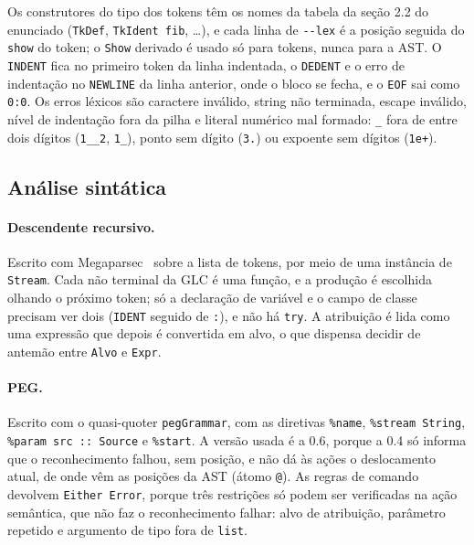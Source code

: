 \documentclass[12pt,a4paper]{article}
\begin{document}
Os construtores do tipo dos tokens têm os nomes da tabela da seção 2.2
do enunciado (\texttt{TkDef}, \texttt{TkIdent \textquotedbl{}fib\textquotedbl}, \ldots), e cada
linha de \texttt{-{}-lex} é a posição seguida do \texttt{show} do token;
o \texttt{Show} derivado é usado só para tokens, nunca para a AST. O
\texttt{INDENT} fica no primeiro token da linha indentada, o
\texttt{DEDENT} e o erro de indentação no \texttt{NEWLINE} da linha
anterior, onde o bloco se fecha, e o \texttt{EOF} sai como
\texttt{0:0}. Os erros léxicos são caractere inválido, string não
terminada, escape inválido, nível de indentação fora da pilha e literal
numérico mal formado: \texttt{\_} fora de entre dois dígitos
(\texttt{1\_\_2}, \texttt{1\_}), ponto sem dígito (\texttt{3.}) ou
expoente sem dígitos (\texttt{1e+}).

\subsection{Análise sintática}

\paragraph{Descendente recursivo.} Escrito com Megaparsec~\cite{megaparsec}
sobre a lista de tokens, por meio de uma instância de \texttt{Stream}.
Cada não terminal da GLC é uma função, e a produção é escolhida olhando
o próximo token; só a declaração de variável e o campo de classe
precisam ver dois (\texttt{IDENT} seguido de \texttt{:}), e não há
\texttt{try}. A atribuição é lida como uma expressão que depois é
convertida em alvo, o que dispensa decidir de antemão entre
\texttt{Alvo} e \texttt{Expr}.

\paragraph{PEG.} Escrito com o quasi-quoter \texttt{pegGrammar}, com as
diretivas \texttt{\%name}, \texttt{\%stream String}, \texttt{\%param src
::\ Source} e \texttt{\%start}. A versão usada é a 0.6, porque a 0.4 só
informa que o reconhecimento falhou, sem posição, e não dá às ações o
deslocamento atual, de onde vêm as posições da AST (átomo \texttt{@}).
As regras de comando devolvem \texttt{Either Error}, porque três
restrições só podem ser verificadas na ação semântica, que não faz o
reconhecimento falhar: alvo de atribuição, parâmetro repetido e
argumento de tipo fora de \texttt{list}.
\end{document}
